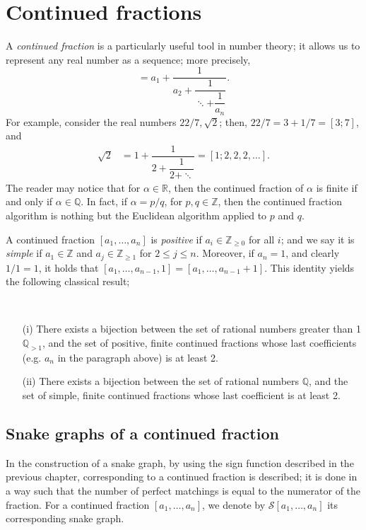 \chapter{Continued fractions}
A \emph{continued fraction} is a particularly useful tool in number theory; it allows us to represent any real number as a sequence; more precisely, 
\begin{equation*}
    [a_1,a_2,\dots,a_n] = a_1 + \dfrac{1}{a_2+\dfrac{1}{\ddots + \dfrac{1}{a_n}}}.
\end{equation*}
For example, consider the real numbers $22/7,\sqrt{2}$; then, $22/7 = 3+1/7 = [3;7]$, and 
\begin{align*}
    \sqrt{2} &= 1 + \dfrac{1}{2+ \dfrac{1}{2 + \ddots}} = [1;2,2,2,\dots].
\end{align*}
The reader may notice that for $\alpha \in \mathbb{R}$, then the continued fraction of $\alpha$ is finite if and only if $\alpha \in \mathbb{Q}$. In fact, if $\alpha = p/q$, for $p,q \in \mathbb{Z}$, then the continued fraction algorithm is nothing but the Euclidean algorithm applied to $p$ and $q$. 

A continued fraction $[a_1,\dots,a_n]$ is \emph{positive} if $a_i \in \mathbb{Z}_{\geq 0}$ for all $i$; and we say it is \emph{simple} if $a_1 \in \mathbb{Z}$ and $a_j \in \mathbb{Z}_{\ge 1}$ for $2 \leq j \leq n$. Moreover, if $a_n = 1$, and clearly $1/1 = 1$, it holds that $[a_1,\dots,a_{n-1},1] = [a_1,\dots,a_{n-1}+1]$. This identity yields the following classical result;
\begin{theorem}\label{thm3.4}~ 
    \begin{itemize}
        \item[(i)] There exists a bijection between the set of rational numbers greater than 1 $\mathbb{Q}_{> 1}$, and the set of positive, finite continued fractions whose last coefficients (e.g. $a_n$ in the paragraph above) is at least 2. 
        \item[(ii)] There exists a bijection between the set of rational numbers $\mathbb{Q}$, and the set of simple, finite continued fractions whose last coefficient is at least 2. 
    \end{itemize}
\end{theorem}
\section{Snake graphs of a continued fraction}
In \cite{CS2} the construction of a snake graph, by using the sign function described in the previous chapter, corresponding to a continued fraction is described; it is done in a way such that the number of perfect matchings is equal to the numerator of the fraction. For a continued fraction $[a_1,\dots,a_n]$, we denote by $\mathcal{S}[a_1,\dots,a_n]$ its corresponding snake graph. 

